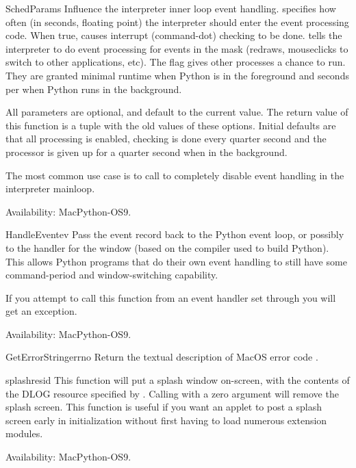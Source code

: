 \begin{funcdesc}{SchedParams}{}
Influence the interpreter inner loop event handling. 
specifies how often (in seconds, floating point) the interpreter
should enter the event processing code. When true,  causes
interrupt (command-dot) checking to be done.  tells the
interpreter to do event processing for events in the mask (redraws,
mouseclicks to switch to other applications, etc). The 
flag gives other processes a chance to run. They are granted minimal
runtime when Python is in the foreground and  seconds per
 when Python runs in the background.

All parameters are optional, and default to the current value. The return
value of this function is a tuple with the old values of these options.
Initial defaults are that all processing is enabled, checking is done every
quarter second and the processor is given up for a quarter second when in the
background.

The most common use case is to call  to completely disable
event handling in the interpreter mainloop.

Availability: MacPython-OS9.
\end{funcdesc}

\begin{funcdesc}{HandleEvent}{ev}
Pass the event record  back to the Python event loop, or
possibly to the handler for the  window (based on the
compiler used to build Python). This allows Python programs that do
their own event handling to still have some command-period and
window-switching capability.

If you attempt to call this function from an event handler set through
 you will get an exception.

Availability: MacPython-OS9.
\end{funcdesc}

\begin{funcdesc}{GetErrorString}{errno}
Return the textual description of MacOS error code .
\end{funcdesc}

\begin{funcdesc}{splash}{resid}
This function will put a splash window
on-screen, with the contents of the DLOG resource specified by
. Calling with a zero argument will remove the splash
screen. This function is useful if you want an applet to post a splash screen
early in initialization without first having to load numerous
extension modules.

Availability: MacPython-OS9.
\end{funcdesc}

